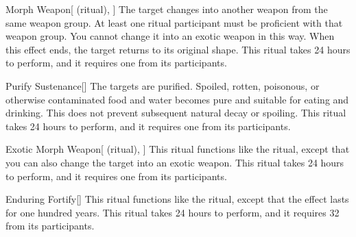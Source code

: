 \lowercase{\hypertarget{spell:Morph Weapon}{}}\label{spell:Morph Weapon}
\begin{attuneability}[Rank 1]{\hypertarget{spell:Morph Weapon}{Morph Weapon}}[ (ritual), ]
The target changes into another weapon from the same weapon group.
At least one ritual participant must be proficient with that weapon group.
You cannot change it into an exotic weapon in this way.
When this effect ends, the target returns to its original shape.
This ritual takes 24 hours to perform, and it requires one  from its participants.
\end{attuneability}
\vspace{0.25em}



\lowercase{\hypertarget{spell:Purify Sustenance}{}}\label{spell:Purify Sustenance}
\begin{freeability}[Rank 1]{\hypertarget{spell:Purify Sustenance}{Purify Sustenance}}[]
The targets are purified.
Spoiled, rotten, poisonous, or otherwise contaminated food and water becomes pure and suitable for eating and drinking.
This does not prevent subsequent natural decay or spoiling.
This ritual takes 24 hours to perform, and it requires one  from its participants.
\end{freeability}
\vspace{0.25em}



\lowercase{\hypertarget{spell:Exotic Morph Weapon}{}}\label{spell:Exotic Morph Weapon}
\begin{attuneability}[Rank 3]{\hypertarget{spell:Exotic Morph Weapon}{Exotic Morph Weapon}}[ (ritual), ]
This ritual functions like the  ritual, except that you can also change the target into an exotic weapon.
This ritual takes 24 hours to perform, and it requires one  from its participants.
\end{attuneability}
\vspace{0.25em}



\lowercase{\hypertarget{spell:Enduring Fortify}{}}\label{spell:Enduring Fortify}
\begin{freeability}[Rank 4]{\hypertarget{spell:Enduring Fortify}{Enduring Fortify}}[]
This ritual functions like the  ritual, except that the effect lasts for one hundred years.
This ritual takes 24 hours to perform, and it requires 32  from its participants.
\end{freeability}
\vspace{0.25em}



